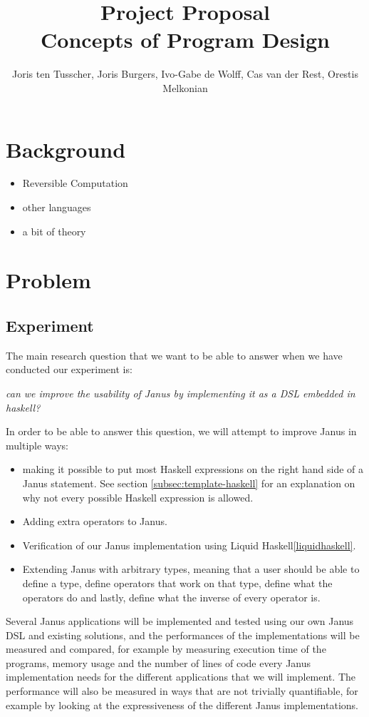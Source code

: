 \documentclass[12pt,a4paper]{article}
\title{\textbf{Project Proposal \\ \small{Concepts of Program Design}}}
\author{\small{Joris ten Tusscher, Joris Burgers, Ivo-Gabe de Wolff, Cas van der Rest, Orestis Melkonian}}
\date{}
\begin{document}
\maketitle

\section{Background}
\begin{itemize}
	\item{Reversible Computation}
	\item{other languages}
	\item{a bit of theory}
\end{itemize}

\section{Problem}
	\subsection{Experiment}
	The main research question that we want to be able to answer when we have conducted our experiment is:
	
	\begin{displayquote}
	\textit{can we improve the usability of Janus by implementing it as a DSL embedded in haskell?}
	\end{displayquote}
	
	\noindent In order to be able to answer this question, we will attempt to improve Janus in multiple ways:
	\begin{itemize}
		\item making it possible to put most Haskell expressions on the right hand side of a Janus statement. See section \ref{subsec:template-haskell} for an explanation on why not every possible Haskell expression is allowed.
		\item Adding extra operators to Janus.
		\item Verification of our Janus implementation using Liquid Haskell\ref{liquidhaskell}.
		\item Extending Janus with arbitrary types, meaning that a user should be able to define a type, define operators that work on that type, define what the operators do and lastly, define what the inverse of every operator is.
	\end{itemize}
	Several Janus applications will be implemented and tested using our own Janus DSL and existing solutions, and the performances of the implementations will be measured and compared, for example by measuring execution time of the programs, memory usage and the number of lines of code every Janus implementation needs for the different applications that we will implement. The performance will also be measured in ways that are not trivially quantifiable, for example by looking at the expressiveness of the different Janus implementations.
	
\end{document}
